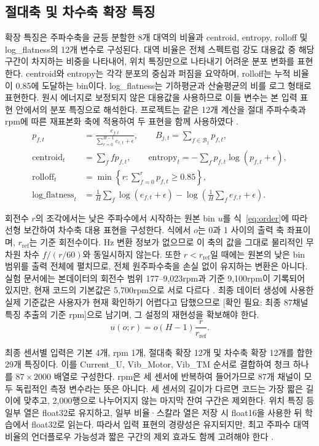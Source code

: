 \documentclass[11pt,a4paper]{article}
\newcommand{\checkneeded}[1]{\textcolor{red!65!black}{[확인 필요: #1]}}
\newcommand{\sourceproject}{\citep{project2026}}
\begin{document}
\subsection{절대축 및 차수축 확장 특징}
확장 특징은 주파수축을 균등 분할한 8개 대역의 비율과 centroid, entropy, rolloff 및 log\_flatness의 12개 변수로 구성된다.
대역 비율은 전체 스펙트럼 강도 대용값 중 해당 구간이 차지하는 비중을 나타내어, 위치 특징만으로 나타내기 어려운 분포 변화를 표현한다.
centroid와 entropy는 각각 분포의 중심과 퍼짐을 요약하며, rolloff는 누적 비율이 0.85에 도달하는 bin이다.
log\_flatness는 기하평균과 산술평균의 비를 로그 형태로 표현한다.
원시 에너지로 보정되지 않은 대용값을 사용하므로 이들 변수는 본 입력 표현 안에서의 분포 특징으로 해석한다.
프로젝트는 같은 12개 계산을 절대 주파수축과 rpm에 따른 재표본화 축에 적용하여 두 표현을 함께 사용하였다 \sourceproject.
\begin{align}
 p_{f,t}&=\frac{e_{f,t}}{\sum_{r=0}^{H-1}e_{r,t}+\epsilon},\qquad
 B_{j,t}=\sum_{f\in\mathcal{B}_j}p_{f,t},\\
 \mathrm{centroid}_t&=\sum_f f p_{f,t},\qquad
 \mathrm{entropy}_t=-\sum_f p_{f,t}\log(p_{f,t}+\epsilon),\\
 \mathrm{rolloff}_t&=\min\left\{r:\sum_{f=0}^{r}p_{f,t}\ge0.85\right\},\\
 \mathrm{log\_flatness}_t&=\frac{1}{H}\sum_f\log(e_{f,t}+\epsilon)
 -\log\left(\frac{1}{H}\sum_f e_{f,t}+\epsilon\right).
\end{align}

회전수 $r$의 조각에서는 낮은 주파수에서 시작하는 원본 bin $u$를 식~\eqref{eq:order}에 따라 선형 보간하여 차수축 대용 표현을 구성한다.
식에서 $o$는 0과 1 사이의 출력 축 좌표이며, $r_{\mathrm{ref}}$는 기준 회전수이다.
Hz 변환 정보가 없으므로 이 축의 값을 그대로 물리적인 무차원 차수 $f/(r/60)$와 동일시하지 않는다.
또한 $r<r_{\mathrm{ref}}$일 때에는 원본의 낮은 bin 범위를 출력 전체에 펼치므로, 전체 원주파수축을 손실 없이 유지하는 변환은 아니다.
실험 문서에는 본데이터의 회전수 범위 177--9,023rpm과 기준 9,100rpm이 기록되어 있지만, 현재 코드의 기본값은 5,700rpm으로 서로 다르다 \sourceproject.
최종 데이터 생성에 사용한 실제 기준값은 사용자가 현재 확인하기 어렵다고 답했으므로 \checkneeded{최종 87채널 특징 추출의 기준 rpm}으로 남기며, 그 설정의 재현성을 확보해야 한다.
\begin{equation}
 u(o;r)=o(H-1)\frac{r}{r_{\mathrm{ref}}}.
 \label{eq:order}
\end{equation}

최종 센서별 입력은 기본 4개, rpm 1개, 절대축 확장 12개 및 차수축 확장 12개를 합한 29개 특징이다.
이를 Current\_U, Vib\_Motor, Vib\_TM 순서로 결합하여 청크 하나를 $87\times2000$ 배열로 구성한다.
rpm은 세 센서에 반복하여 들어가므로 87개 채널이 모두 독립적인 측정 변수라는 뜻은 아니다.
세 센서의 길이가 다르면 코드는 가장 짧은 길이에 맞추고, 2,000행으로 나누어지지 않는 마지막 잔여 구간은 제외한다.
위치 특징 등 일부 열은 float32로 유지하고, 일부 비율·스칼라 열은 저장 시 float16을 사용한 뒤 학습에서 float32로 읽는다.
따라서 입력 표현의 경량성은 유지되지만, 최고 주파수 대역 비율의 언더플로우 가능성과 짧은 구간의 제외 효과도 함께 고려해야 한다 \sourceproject.
\end{document}
